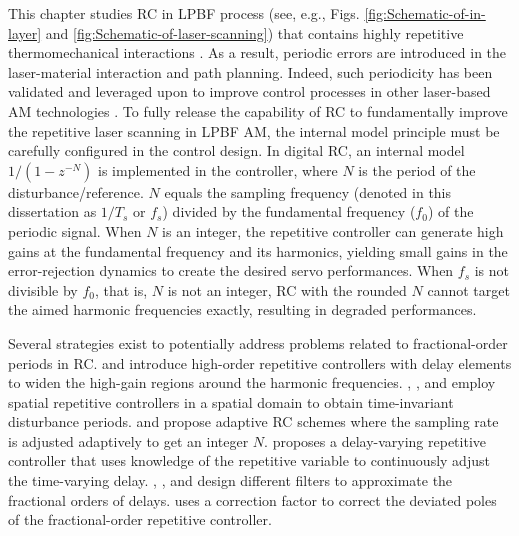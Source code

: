 \documentclass [11pt, proquest] {uwthesis}[2020/02/24]
\begin{document}
This chapter studies RC in LPBF process (see, e.g., Figs. \ref{fig:Schematic-of-in-layer} and \ref{fig:Schematic-of-laser-scanning})
 that contains highly repetitive thermomechanical interactions \cite{carter2014influence,kruth2004selective,simchi2003effects}.
As a result, periodic errors are introduced in the laser-material
interaction and path planning. Indeed, such periodicity has been validated
and leveraged upon to improve control processes in other laser-based
AM technologies \cite{hoelzle2016spatial,lim2017multi,heralic2012height}. To fully release the capability of RC to fundamentally improve the
repetitive laser scanning in LPBF AM, the internal model principle
\cite{francis1975internal,hara1988repetitive} must be carefully
configured in the control design. In digital RC, an internal model
$1/(1-z^{-N})$ is implemented in the controller, where $N$ is the period
of the disturbance/reference. $N$ equals the sampling frequency (denoted
in this dissertation as $1/T_{s}$ or $f_{s}$) divided by the fundamental
frequency ($f_{0}$) of the periodic signal. When $N$ is an integer,
the repetitive controller can generate high gains at the fundamental
frequency and its harmonics, yielding small gains in the error-rejection
dynamics to create the desired servo performances. When $f_{s}$ is
not divisible by $f_{0}$, that is, $N$ is not an integer, RC with
the rounded $N$ cannot target the aimed harmonic frequencies exactly,
resulting in degraded performances.

Several strategies exist to potentially address problems related to
fractional-order periods in RC. \cite{steinbuch2007design} and \cite{ramos2012power}
introduce high-order repetitive controllers with delay elements to
widen the high-gain regions around the harmonic frequencies. \cite{nakano1996elimination},
\cite{yao2013implementation}, and \cite{chen2013linear} employ
spatial repetitive controllers in a spatial domain to obtain time-invariant
disturbance periods. \cite{cao2002adaptive} and \cite{kurniawan2011adaptive}
propose adaptive RC schemes where the sampling rate is adjusted adaptively
to get an integer $N$. \cite{merry2011delay} proposes a delay-varying
repetitive controller that uses knowledge of the repetitive variable
to continuously adjust the time-varying delay. \cite{nazir2015analysis},
\cite{liu2017universal}, and \cite{zou2015frequency} design different
filters to approximate the fractional orders of delays. \cite{liu2016high}
uses a correction factor to correct the deviated poles of the fractional-order
repetitive controller.
\end{document}
